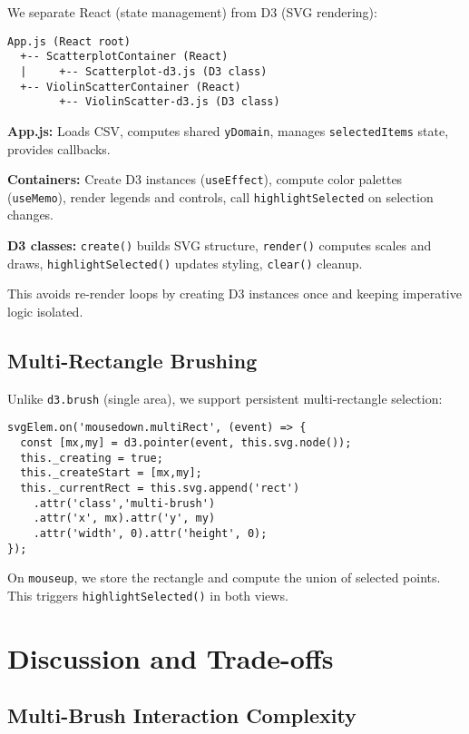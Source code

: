 \documentclass[sigplan,screen]{acmart}
\begin{document}
We separate React (state management) from D3 (SVG rendering):

\begin{verbatim}
App.js (React root)
  +-- ScatterplotContainer (React)
  |     +-- Scatterplot-d3.js (D3 class)
  +-- ViolinScatterContainer (React)
        +-- ViolinScatter-d3.js (D3 class)
\end{verbatim}

\textbf{App.js:} Loads CSV, computes shared \texttt{yDomain}, manages
\texttt{selectedItems} state, provides callbacks.

\textbf{Containers:} Create D3 instances (\texttt{useEffect}), compute
color palettes (\texttt{useMemo}), render legends and controls, call
\texttt{highlightSelected} on selection changes.

\textbf{D3 classes:} \texttt{create()} builds SVG structure,
\texttt{render()} computes scales and draws, \texttt{highlightSelected()}
updates styling, \texttt{clear()} cleanup.

This avoids re-render loops by creating D3 instances once and keeping
imperative logic isolated.

\subsection{Multi-Rectangle Brushing}

Unlike \texttt{d3.brush} (single area), we support persistent
multi-rectangle selection:

\begin{verbatim}
svgElem.on('mousedown.multiRect', (event) => {
  const [mx,my] = d3.pointer(event, this.svg.node());
  this._creating = true;
  this._createStart = [mx,my];
  this._currentRect = this.svg.append('rect')
    .attr('class','multi-brush')
    .attr('x', mx).attr('y', my)
    .attr('width', 0).attr('height', 0);
});
\end{verbatim}

On \texttt{mouseup}, we store the rectangle and compute the union of
selected points. This triggers \texttt{highlightSelected()} in both
views.

\section{Discussion and Trade-offs}
\label{sec:discussion}

\subsection{Multi-Brush Interaction Complexity}
\end{document}
